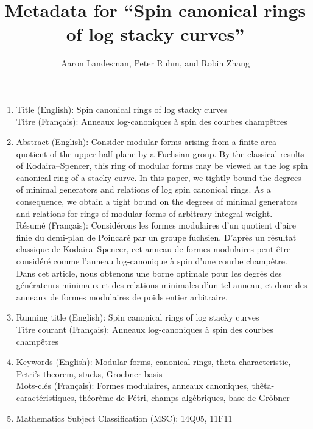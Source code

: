 \documentclass[10 pt]{amsart}
\title{Metadata for ``Spin canonical rings of log stacky curves''}
\author{Aaron Landesman, Peter Ruhm, and Robin Zhang}
\theoremstyle{plain}
\theoremstyle{definition}
\theoremstyle{remark}
\numberwithin{equation}{section}
\begin{document}
\maketitle

\begin{enumerate}
	\item Title (English): Spin canonical rings of log stacky curves \\
		Titre (Fran\c{c}ais): Anneaux log-canoniques \`{a} spin des
		courbes champ\^{e}tres
	\item Abstract (English): Consider modular forms arising from a
		finite-area quotient of the upper-half plane by a Fuchsian group.
		By the classical results of Kodaira--Spencer, this ring of
		modular forms may be viewed as the log spin canonical ring of a
		stacky curve. In this paper, we tightly bound the degrees of
		minimal generators and relations of log spin canonical rings.
		As a 	consequence, we obtain a tight bound on the degrees of
		minimal generators and relations for rings of modular forms of
		arbitrary integral weight. \\
		R\'{e}sum\'{e} (Fran\c{c}ais): Consid\'{e}rons les formes
		modulaires d'un quotient d'aire finie du demi-plan
		de Poincar\'{e} par un groupe fuchsien. D'apr\`{e}s un
		r\'{e}sultat classique de Kodaira--Spencer, cet anneau de
		formes modulaires	peut \^{e}tre consid\'{e}r\'{e} comme
		l'anneau log-canonique \`{a} spin d'une courbe champ\^{e}tre.
		Dans cet article, nous  obtenons une borne optimale pour les
		degr\'{e}s des g\'{e}n\'{e}rateurs minimaux et des relations
		minimales d'un tel anneau, et donc des anneaux de formes
		modulaires de poids entier arbitraire.
	\item Running title (English): Spin canonical rings of log stacky
		curves \\
		Titre courant (Fran\c{c}ais): Anneaux log-canoniques \`{a} spin des
		courbes champ\^{e}tres
	\item Keywords (English): Modular forms, canonical rings, theta
		characteristic, Petri's theorem, stacks, Groebner basis \\
		Mots-cl\'{e}s (Fran\c{c}ais): Formes modulaires, anneaux canoniques,
		th\^{e}ta-caract\'{e}ristiques, th\'{e}or\`{e}me de P\'{e}tri,
		champs alg\'{e}briques, base de Gr\"{o}bner
	\item Mathematics Subject Classification (MSC): 14Q05, 11F11
  \end{enumerate}
\end{document}
